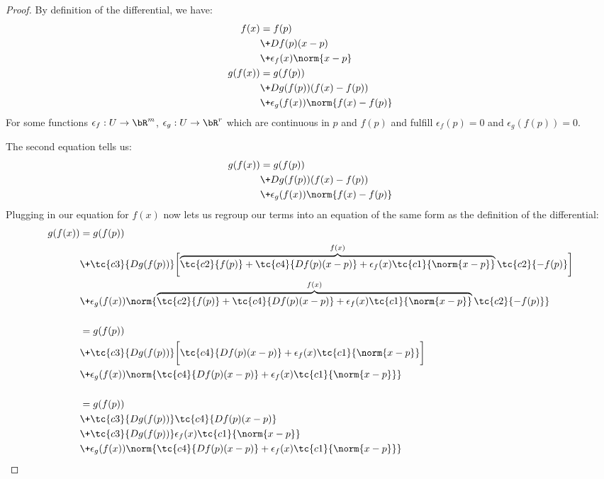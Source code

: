\begin{proof}
	By definition of the differential, we have:
	\begin{align*}
		f(x) 
		&= f(p)\\
		&\+ 
		Df(p)(x-p)\\
		&\+ 
		\epsilon_f(x)\norm{x - p}\\
		g(f(x))
		&=
		g(f(p))\\
		&\+
		Dg(f(p))(f(x)-f(p))\\
		&\+
		\epsilon_g(f(x))\norm{f(x) - f(p)}
	\end{align*}
	For some functions $\epsilon_f : U \to \bR^m$, $\epsilon_g : U \to \bR^r$ which are continuous in $p$ and $f(p)$ and fulfill $\epsilon_f(p) = 0$ and $\epsilon_g(f(p)) = 0$. 
	
	The second equation tells us:
	\begin{align*}
		g(f(x))
		&=
		g(f(p))\\
		&\+
		Dg(f(p))(f(x) - f(p))\\
		&\+ \epsilon_g(f(x))\norm{f(x) - f(p)}
	\end{align*}
	Plugging in our equation for $f(x)$ now lets us regroup our terms into an equation of the same form as the definition of the differential:
	\begin{align*}
		g(f(x))
		&=
		g(f(p))\\
		&\+
		\tc{c3}{Dg(f(p))}
		\biggl[
			\overbrace{
			\tc{c2}{f(p)}
			+ 
			\tc{c4}{Df(p)(x-p)}
			+ 
			\epsilon_f(x)\tc{c1}{\norm{x - p}}}^{f(x)} \tc{c2}{- f(p)}
		\biggr]
		\\
		&\+ 
		\epsilon_g(f(x))
		\norm{
			\overbrace{\tc{c2}{f(p)}
			+ 
			\tc{c4}{Df(p)(x-p)}
			+ 
			\epsilon_f(x)\tc{c1}{\norm{x - p}}}^{f(x)} \tc{c2}{- f(p)}
		}
		\\
	\\
		&=
		g(f(p))\\
		&\+
		\tc{c3}{Dg(f(p))}
		\biggl[
			\tc{c4}{Df(p)(x-p)}
			+ 
			\epsilon_f(x)\tc{c1}{\norm{x - p}}
		\biggr]
		\\
		&\+ 
		\epsilon_g(f(x))
		\norm{
			\tc{c4}{Df(p)(x-p)}
			+ 
			\epsilon_f(x)\tc{c1}{\norm{x - p}}
		}
		\\
	\\
		&=
		g(f(p))\\
		&\+
		\tc{c3}{Dg(f(p))}\tc{c4}{Df(p)(x-p)}\\
		&\+ 
		\tc{c3}{Dg(f(p))}\epsilon_f(x)\tc{c1}{\norm{x - p}}
		\\
		&\+ 
		\epsilon_g(f(x))
		\norm{
			\tc{c4}{Df(p)(x-p)}
			+ 
			\epsilon_f(x)\tc{c1}{\norm{x - p}}
}
\end{align*}
\end{proof}
